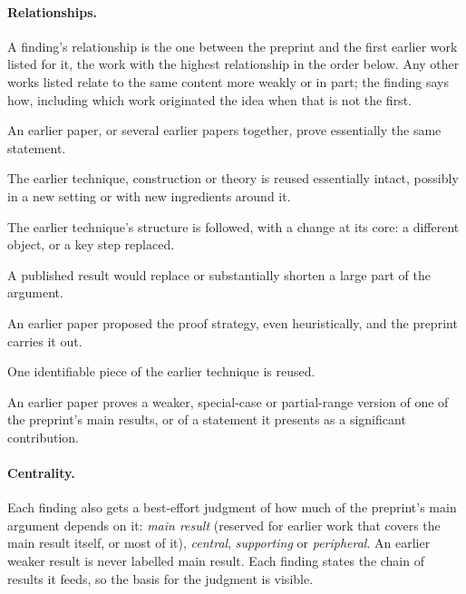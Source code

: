 \paragraph{Relationships.}
A finding's relationship is the one between the preprint and the first
earlier work listed for it, the work with the highest relationship in the
order below. Any other works listed relate to the same content more weakly or
in part; the finding says how, including which work originated the idea when
that is not the first.
\begin{description}[leftmargin=1.5em,font=\normalfont\itshape]
\item[same result.] An earlier paper, or several earlier papers together, prove essentially the same statement.
\item[same technique.] The earlier technique, construction or theory is
reused essentially intact, possibly in a new setting or with new ingredients
around it.
\item[adapted.] The earlier technique's structure is followed, with a change
at its core: a different object, or a key step replaced.
\item[proof shortcut.] A published result would replace or substantially
shorten a large part of the argument.
\item[same route.] An earlier paper proposed the proof strategy, even
heuristically, and the preprint carries it out.
\item[fragment.] One identifiable piece of the earlier technique is reused.
\item[weaker result.] An earlier paper proves a weaker, special-case or
partial-range version of one of the preprint's main results, or of a
statement it presents as a significant contribution.
\end{description}

\paragraph{Centrality.}
Each finding also gets a best-effort judgment of how much of the preprint's
main argument depends on it: \emph{main result} (reserved for earlier work that
covers the main result itself, or most of it), \emph{central},
\emph{supporting} or \emph{peripheral}. An earlier weaker result is never
labelled main result. Each finding states the chain of results it feeds, so
the basis for the judgment is visible.

